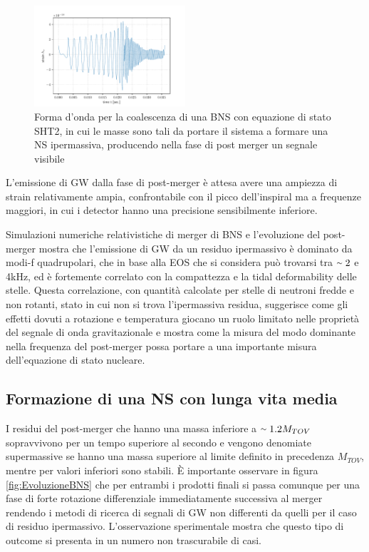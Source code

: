\begin{figure}
	\vspace{-20pt}
	\begin{center}
		\includegraphics[width=0.5\textwidth]{figures/Capitolo_1/SHT2.0.pdf}
	\end{center}
	\vspace{-10pt}
	\caption{Forma d'onda per la coalescenza di una BNS con equazione di stato SHT2, in cui le masse sono tali da portare il sistema a formare una NS ipermassiva, producendo nella fase di post merger un segnale visibile}
	\label{fig:FormaOndaToNS}
	\vspace{-20pt}
\end{figure}

L'emissione di GW dalla fase di post-merger è attesa avere una ampiezza di strain relativamente ampia, confrontabile con il picco dell'inspiral ma a frequenze maggiori, in cui i detector hanno una precisione sensibilmente inferiore.

Simulazioni numeriche relativistiche di merger di BNS e l'evoluzione del post-merger mostra che l'emissione di GW da un residuo ipermassivo è dominato da modi-f quadrupolari, che in base alla EOS che si considera può trovarsi tra $\smallsim2$ e 4kHz, ed è fortemente correlato con la compattezza e la tidal deformability delle stelle. Questa correlazione, con quantità calcolate per stelle di neutroni fredde e non rotanti, stato in cui non si trova l'ipermassiva residua, suggerisce come gli effetti dovuti a rotazione e temperatura giocano un ruolo limitato nelle proprietà del segnale di onda gravitazionale e mostra come la misura del modo dominante nella frequenza del post-merger possa portare a una importante misura dell'equazione di stato nucleare\cite{sarin2020evolution}.

\subsection{Formazione di una NS con lunga vita media}
\label{subsection:long_lived}
I residui del post-merger che hanno una massa inferiore a $\smallsim1.2M_{TOV}$ sopravvivono per un tempo superiore al secondo e vengono denomiate supermassive se hanno una massa superiore al limite definito in precedenza $M_{TOV}$, mentre per valori inferiori sono stabili.
È importante osservare in figura \ref{fig:EvoluzioneBNS} che per entrambi i prodotti finali si passa comunque per una fase di forte rotazione differenziale immediatamente successiva al merger rendendo i metodi di ricerca di segnali di GW non differenti da quelli per il caso di residuo ipermassivo.
L'osservazione sperimentale mostra che questo tipo di outcome si presenta in un numero non trascurabile di casi.

